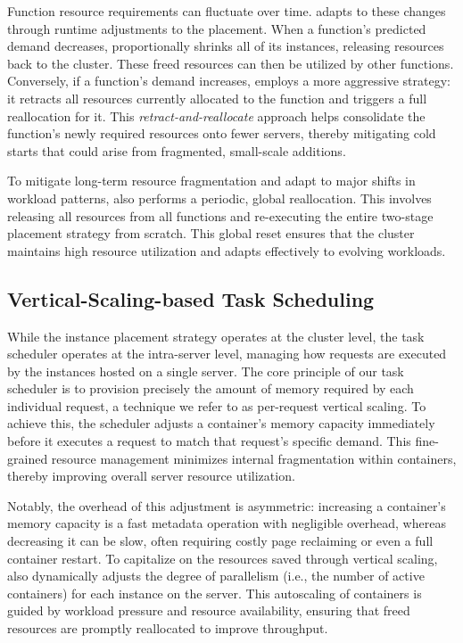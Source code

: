 Function resource requirements can fluctuate over time.
\sysname adapts to these changes through runtime adjustments to the placement.
When a function's predicted demand decreases, \sysname proportionally shrinks all of its instances, releasing resources back to the cluster.
These freed resources can then be utilized by other functions.
Conversely, if a function's demand increases, \sysname employs a more aggressive strategy: it retracts all resources currently allocated to the function and triggers a full reallocation for it.
This \emph{retract-and-reallocate} approach helps consolidate the function's newly required resources onto fewer servers, thereby mitigating cold starts that could arise from fragmented, small-scale additions.

To mitigate long-term resource fragmentation and adapt to major shifts in workload patterns, \sysname also performs a periodic, global reallocation. This involves releasing all resources from all functions and re-executing the entire two-stage placement strategy from scratch.
This global reset ensures that the cluster maintains high resource utilization and adapts effectively to evolving workloads.

\subsection{Vertical-Scaling-based Task Scheduling}

While the instance placement strategy operates at the cluster level, the task scheduler operates at the intra-server level, managing how requests are executed by the instances hosted on a single server.
The core principle of our task scheduler is to provision precisely the amount of memory required by each individual request, a technique we refer to as per-request vertical scaling.
To achieve this, the scheduler adjusts a container's memory capacity immediately before it executes a request to match that request's specific demand. This fine-grained resource management minimizes internal fragmentation within containers, thereby improving overall server resource utilization.

Notably, the overhead of this adjustment is asymmetric: increasing a container's memory capacity is a fast metadata operation with negligible overhead, whereas decreasing it can be slow, often requiring costly page reclaiming or even a full container restart.
To capitalize on the resources saved through vertical scaling, \sysname also dynamically adjusts the degree of parallelism (i.e., the number of active containers) for each instance on the server.
This autoscaling of containers is guided by workload pressure and resource availability, ensuring that freed resources are promptly reallocated to improve throughput.

